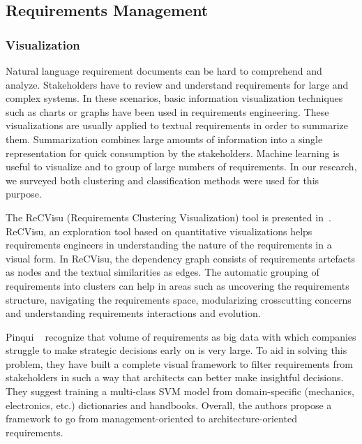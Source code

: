 \subsection{Requirements Management}


\subsubsection{Visualization}

Natural language requirement documents can be hard to comprehend and analyze.
Stakeholders have to review and understand requirements for large and
complex systems. In these scenarios, basic information visualization
techniques such as charts or graphs have been used in requirements
engineering.
These visualizations are usually applied to textual requirements in order to summarize
them. Summarization combines large amounts of information into a
single representation for quick consumption by the
stakeholders\cite{Reddivari:2012}.
Machine learning is useful to visualize and to group of large numbers of
requirements. In our research, we surveyed both clustering and classification
methods were used for this purpose.

The ReCVisu (Requirements Clustering Visualization) tool is presented
in~\cite{Reddivari:2012}. ReCVisu, an exploration tool based on quantitative
visualizations helps requirements engineers in understanding the nature of the
requirements in a visual form. In ReCVisu, the dependency graph consists of
requirements artefacts as nodes and the textual similarities as edges. The
automatic grouping of requirements into clusters can help in areas such as
uncovering the requirements structure, navigating the requirements space,
modularizing crosscutting concerns and understanding requirements interactions
and evolution.

Pinqui \etal~\cite{Pinqui:2015} recognize that volume of requirements as big
data with which companies struggle to make strategic decisions early on is
very large. To aid in solving this problem, they have built a complete visual
framework to filter requirements from stakeholders in such a way that architects
can better make insightful decisions. They suggest training a multi-class SVM
model from domain-specific (mechanics, electronics, etc.) dictionaries and handbooks.
Overall, the authors propose a framework to go from management-oriented to
architecture-oriented requirements.

